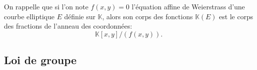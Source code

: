 \documentclass[10pt,a4paper]{book}
\theoremstyle{plain}
\theoremstyle{definition}
\theoremstyle{definition}
\theoremstyle{definition}
\theoremstyle{definition}
\theoremstyle{remark}
\theoremstyle{remark}
\theoremstyle{definition}
\begin{document}
On rappelle que si l'on note $f(x,y)=0$ l'équation affine de Weierstrass d'une 
courbe elliptique $E$ définie sur $\mathbb{K}$, alors son corps des fonctions 
$\mathbb{K}(E)$ est le corps des fractions de l'anneau des coordonnées:
\begin{equation*}
\mathbb{K}[x,y]/(f(x,y)).
\end{equation*}

\subsection{Loi de groupe}
%
\end{document}
